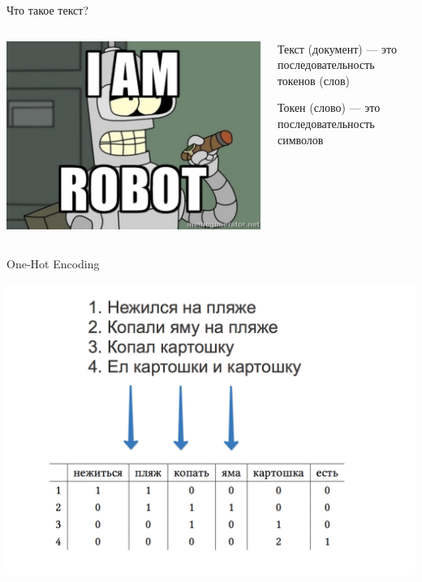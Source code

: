 \documentclass[notes,12pt, aspectratio=169]{beamer}
\newenvironment{wideitemize}{\itemize\addtolength{\itemsep}{10pt}}{\enditemize}
\begin{document}
\begin{frame}{Что такое текст?}
\begin{columns}
\begin{column}{.48\linewidth}
	\includegraphics[scale=0.3]{bender.png}
\end{column}

	\begin{column}{.48\linewidth}
\begin{wideitemize} 
	\item  Текст (документ) —  это последовательность токенов (слов)
	\item  Токен (слово) —  это последовательность символов
\end{wideitemize}
	\end{column}	
\end{columns}
\end{frame} 


\begin{frame}{One-Hot Encoding}
\begin{center}
	\includegraphics[width=.7\linewidth]{text.png}
\end{center}
\end{frame} 
\end{document}

